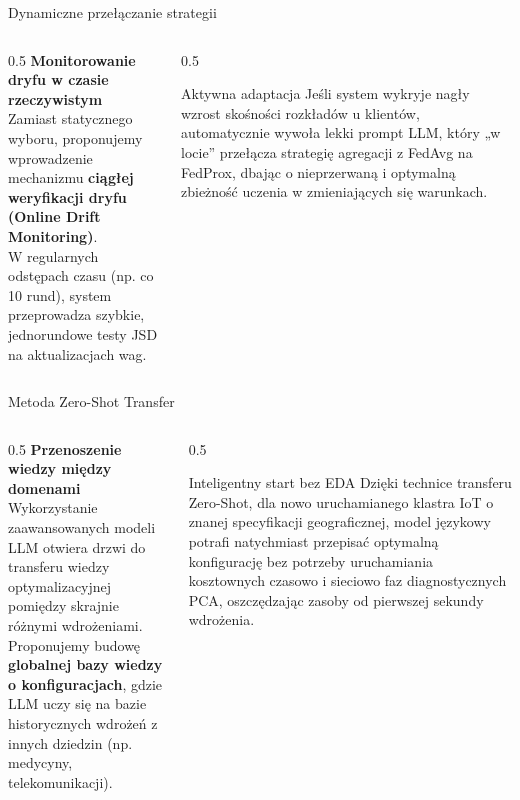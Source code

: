 \documentclass[9pt,aspectratio=169]{beamer}
\begin{document}
\begin{frame}{Dynamiczne przełączanie strategii}
\begin{columns}[T]
\begin{column}{0.5\textwidth}
\textbf{Monitorowanie dryfu w czasie rzeczywistym}\\[4pt]
Zamiast statycznego wyboru, proponujemy wprowadzenie mechanizmu \textbf{ciągłej weryfikacji dryfu (Online Drift Monitoring)}.\\[6pt]
W regularnych odstępach czasu (np. co 10 rund), system przeprowadza szybkie, jednorundowe testy JSD na aktualizacjach wag.
\end{column}
\begin{column}{0.5\textwidth}
\begin{infoboxgreen}{Aktywna adaptacja}
Jeśli system wykryje nagły wzrost skośności rozkładów u klientów, automatycznie wywoła lekki prompt LLM, który „w locie” przełącza strategię agregacji z FedAvg na FedProx, dbając o nieprzerwaną i optymalną zbieżność uczenia w zmieniających się warunkach.
\end{infoboxgreen}
\end{column}
\end{columns}
\end{frame}

\begin{frame}{Metoda Zero-Shot Transfer}
\begin{columns}[T]
\begin{column}{0.5\textwidth}
\textbf{Przenoszenie wiedzy między domenami}\\[4pt]
Wykorzystanie zaawansowanych modeli LLM otwiera drzwi do transferu wiedzy optymalizacyjnej pomiędzy skrajnie różnymi wdrożeniami.\\[6pt]
Proponujemy budowę \textbf{globalnej bazy wiedzy o konfiguracjach}, gdzie LLM uczy się na bazie historycznych wdrożeń z innych dziedzin (np. medycyny, telekomunikacji).
\end{column}
\begin{column}{0.5\textwidth}
\begin{infoboxgreen}{Inteligentny start bez EDA}
Dzięki technice transferu Zero-Shot, dla nowo uruchamianego klastra IoT o znanej specyfikacji geograficznej, model językowy potrafi natychmiast przepisać optymalną konfigurację bez potrzeby uruchamiania kosztownych czasowo i sieciowo faz diagnostycznych PCA, oszczędzając zasoby od pierwszej sekundy wdrożenia.
\end{infoboxgreen}
\end{column}
\end{columns}
\end{frame}
\end{document}
